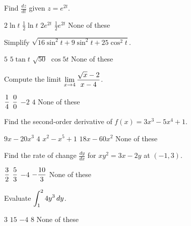 \documentclass[12pt]{exam}
\newcommand{\ds}{\ensuremath{\displaystyle}}
\begin{document}
\begin{questions}

\setcounter{question}{0}

\question[5]
Find $\frac{dz}{dt}$ given $z=e^{2t}$.

\begin{checkboxes}
\choice $2\ln t$
\choice $\frac{1}{2}\ln t$
\CorrectChoice $2e^{2t}$
\choice $\frac{1}{2}e^{2t}$
\choice None of these
\end{checkboxes}

\vfill

\question[5]
Simplify $\sqrt{16\sin^2 t+9\sin^2 t + 25\cos^2 t}$.

\begin{checkboxes}
\CorrectChoice $5$
\choice $5\tan t$
\choice $\sqrt{50}$
\choice $\cos{5t}$
\choice None of these
\end{checkboxes}

\vfill

\question[5]
Compute the limit $\ds\lim_{x\to 4}\frac{\sqrt{x}-2}{x-4}$.

\begin{checkboxes}
\CorrectChoice $\ds\frac{1}{4}$
\choice $\ds\frac{0}{0}$
\choice $-2$
\choice $4$
\choice None of these
\end{checkboxes}

\vfill

\question[5]
Find the second-order derivative of $f(x)=3x^3-5x^4+1$.

\begin{checkboxes}
\choice $9x-20x^3$
\choice $4$
\choice $x^2-x^5+1$
\CorrectChoice $18x-60x^2$
\choice None of these
\end{checkboxes}

\vfill

\newpage

\question[5]
Find the rate of change $\frac{dy}{dx}$ for $xy^2=3x-2y$ at $(-1,3)$.

\begin{checkboxes}
\CorrectChoice $\ds\frac{3}{2}$
\choice $\ds\frac{5}{3}$
\choice $-4$
\choice $\ds-\frac{10}{3}$
\choice None of these
\end{checkboxes}

\vfill

\question[5]
Evaluate $\ds\int_1^2 4y^3 \,dy$.

\begin{checkboxes}
\choice $3$
\CorrectChoice $15$
\choice $-4$
\choice $8$
\choice None of these
\end{checkboxes}


\end{questions}
\end{document}

